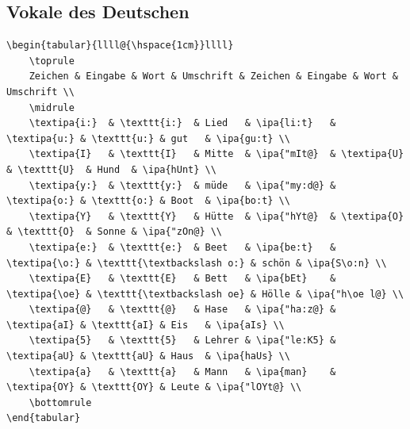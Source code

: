 \subsection{Vokale des Deutschen}

\begin{lstlisting}[style=latex]
\begin{tabular}{llll@{\hspace{1cm}}llll}
	\toprule
	Zeichen & Eingabe & Wort & Umschrift & Zeichen & Eingabe & Wort & Umschrift \\
	\midrule
	\textipa{i:}  & \texttt{i:}  & Lied   & \ipa{li:t}   & \textipa{u:} & \texttt{u:} & gut   & \ipa{gu:t} \\
	\textipa{I}   & \texttt{I}   & Mitte  & \ipa{"mIt@}  & \textipa{U}  & \texttt{U}  & Hund  & \ipa{hUnt} \\
	\textipa{y:}  & \texttt{y:}  & müde   & \ipa{"my:d@} & \textipa{o:} & \texttt{o:} & Boot  & \ipa{bo:t} \\
	\textipa{Y}   & \texttt{Y}   & Hütte  & \ipa{"hYt@}  & \textipa{O}  & \texttt{O}  & Sonne & \ipa{"zOn@} \\
	\textipa{e:}  & \texttt{e:}  & Beet   & \ipa{be:t}   & \textipa{\o:} & \texttt{\textbackslash o:} & schön & \ipa{S\o:n} \\
	\textipa{E}   & \texttt{E}   & Bett   & \ipa{bEt}    & \textipa{\oe} & \texttt{\textbackslash oe} & Hölle & \ipa{"h\oe l@} \\
	\textipa{@}   & \texttt{@}   & Hase   & \ipa{"ha:z@} & \textipa{aI} & \texttt{aI} & Eis   & \ipa{aIs} \\
	\textipa{5}   & \texttt{5}   & Lehrer & \ipa{"le:K5} & \textipa{aU} & \texttt{aU} & Haus  & \ipa{haUs} \\
	\textipa{a}   & \texttt{a}   & Mann   & \ipa{man}    & \textipa{OY} & \texttt{OY} & Leute & \ipa{"lOYt@} \\
	\bottomrule
\end{tabular}
\end{lstlisting}

